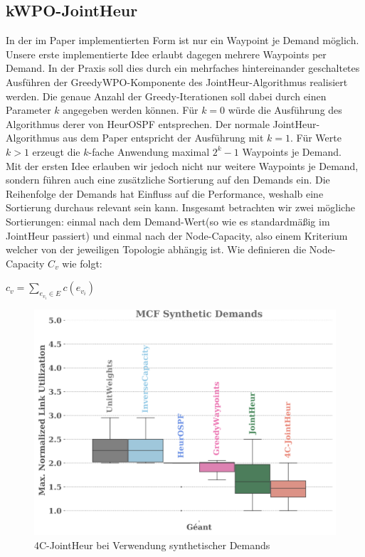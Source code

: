 \subsection{kWPO-JointHeur}
In der im Paper implementierten Form ist nur ein Waypoint je Demand möglich. Unsere erste implementierte Idee erlaubt dagegen mehrere Waypoints per Demand.
In der Praxis soll dies durch ein mehrfaches hintereinander geschaltetes Ausführen der GreedyWPO-Komponente des JointHeur-Algorithmus realisiert werden. Die genaue Anzahl der Greedy-Iterationen
soll dabei durch einen Parameter $k$ angegeben werden können. Für $k = 0$ würde die Ausführung des Algorithmus derer von HeurOSPF entsprechen. Der normale JointHeur-Algorithmus aus dem Paper entspricht der Ausführung mit $k=1$. Für Werte $k > 1$ erzeugt die $k$-fache Anwendung maximal $2^{k}-1$ Waypoints je Demand. \\
Mit der ersten Idee erlauben wir jedoch nicht nur weitere Waypoints je Demand, sondern führen auch eine zusätzliche Sortierung auf den Demands ein. Die Reihenfolge der Demands hat Einfluss auf die Performance, weshalb eine Sortierung durchaus relevant sein kann. Insgesamt betrachten wir zwei mögliche Sortierungen: einmal nach dem Demand-Wert(so wie es standardmäßig im JointHeur passiert) und einmal nach der Node-Capacity, also einem Kriterium welcher von der jeweiligen Topologie abhängig ist.
Wie definieren die Node-Capacity $C_v$ wie folgt: \begin{center} $c_v = \sum_{e_{v_{i}} \in E} c(e_{v_i})$\end{center}
\begin{figure}[h]
  \centering 
  \includegraphics[width=\linewidth]{abbildungen/PNG-Bild}
  \caption{4C-JointHeur bei Verwendung synthetischer Demands}
\end{figure}
